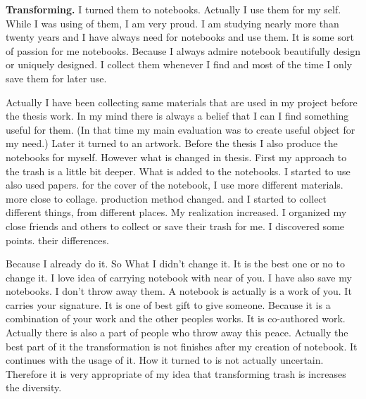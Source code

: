 %
%
\textbf{Transforming.} I turned them to notebooks. Actually I use them for my self. While I was using of them, I am very proud. I am studying nearly more than twenty years and I have always need for notebooks and use them. It is some sort of passion for me notebooks. Because I always admire notebook beautifully design or uniquely designed. I collect them whenever I find and most of the time I only save them for later use. 


Actually I have been collecting same materials that are used in my project before the thesis work. In my mind there is always a belief that I can I find something useful for them. (In that time my main evaluation was to create useful object for my need.) Later it turned to an artwork. Before the thesis I also produce the notebooks for myself. However what is changed in thesis. First my approach to the trash is a little bit deeper. What is added to the notebooks. I started to use also used papers. for the cover of the notebook, I use more different materials. more close to collage. production method changed. and I started to collect different things, from different places. My realization increased. I organized my close friends and others to collect or save their trash for me. I discovered some points. their differences. 

Because I already do it. So What I didn't change it. It is the best one or no to change it. I love idea of carrying notebook with near of you. I have also save my notebooks. I don't throw away them. A notebook is actually is a work of you. It carries your signature. It is one of best gift to give someone. Because it is a combination of your work and the other peoples works. It is co-authored work. Actually there is also a part of people who throw away this peace. Actually the best part of it the transformation is not finishes after my creation of notebook. It continues with the usage of it. How it turned to is not actually uncertain. Therefore it is very appropriate of my idea that transforming trash is increases the diversity.

